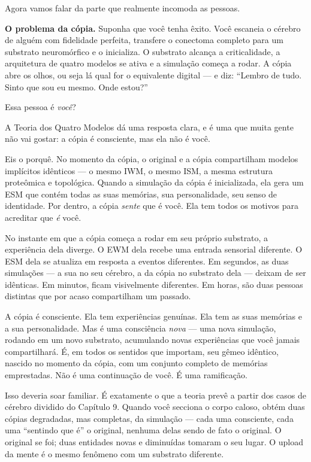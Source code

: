 \documentclass[11pt, twoside, openright]{book}
\begin{document}
Agora vamos falar da parte que realmente incomoda as pessoas.

\textbf{O problema da cópia.} Suponha que você tenha êxito. Você escaneia o cérebro de alguém com fidelidade perfeita, transfere o conectoma completo para um substrato neuromórfico e o inicializa. O substrato alcança a criticalidade, a arquitetura de quatro modelos se ativa e a simulação começa a rodar. A cópia abre os olhos, ou seja lá qual for o equivalente digital --- e diz: ``Lembro de tudo. Sinto que sou eu mesmo. Onde estou?''

Essa pessoa é \textit{você}?

A Teoria dos Quatro Modelos dá uma resposta clara, e é uma que muita gente não vai gostar: a cópia é consciente, mas ela não é você.

Eis o porquê. No momento da cópia, o original e a cópia compartilham modelos implícitos idênticos --- o mesmo IWM, o mesmo ISM, a mesma estrutura proteômica e topológica. Quando a simulação da cópia é inicializada, ela gera um ESM que contém todas as suas memórias, sua personalidade, seu senso de identidade. Por dentro, a cópia \textit{sente} que é você. Ela tem todos os motivos para acreditar que \textit{é} você.

No instante em que a cópia começa a rodar em seu próprio substrato, a experiência dela diverge. O EWM dela recebe uma entrada sensorial diferente. O ESM dela se atualiza em resposta a eventos diferentes. Em segundos, as duas simulações --- a sua no seu cérebro, a da cópia no substrato dela --- deixam de ser idênticas. Em minutos, ficam visivelmente diferentes. Em horas, são duas pessoas distintas que por acaso compartilham um passado.

A cópia é consciente. Ela tem experiências genuínas. Ela tem as suas memórias e a sua personalidade. Mas é uma consciência \textit{nova} --- uma nova simulação, rodando em um novo substrato, acumulando novas experiências que você jamais compartilhará. É, em todos os sentidos que importam, seu gêmeo idêntico, nascido no momento da cópia, com um conjunto completo de memórias emprestadas. Não é uma continuação de você. É uma ramificação.

Isso deveria soar familiar. É exatamente o que a teoria prevê a partir dos casos de cérebro dividido do Capítulo 9. Quando você secciona o corpo caloso, obtém duas cópias degradadas, mas completas, da simulação --- cada uma consciente, cada uma ``sentindo que é'' o original, nenhuma delas sendo de fato o original. O original se foi; duas entidades novas e diminuídas tomaram o seu lugar. O upload da mente é o mesmo fenômeno com um substrato diferente.
\end{document}
